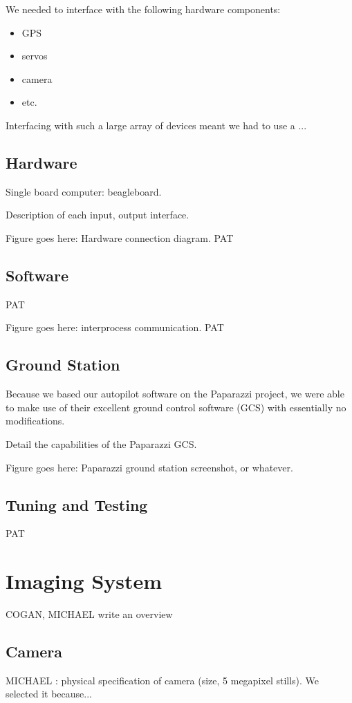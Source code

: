 \documentclass[10pt]{report}
\begin{document}
We needed to interface with the following hardware components:
\begin{itemize}
	\item GPS
	\item servos
	\item camera
	\item etc.
\end{itemize}

Interfacing with such a large array of devices meant we had to use a ...

\subsection{Hardware}
Single board computer: beagleboard.

Description of each input, output interface.

Figure goes here: Hardware connection diagram. PAT
\subsection{Software}
PAT

Figure goes here: interprocess communication. PAT
\subsection{Ground Station}
Because we based our autopilot software on the Paparazzi project, we were able to make use of their excellent ground control software (GCS) with essentially no modifications.

Detail the capabilities of the Paparazzi GCS.

Figure goes here: Paparazzi ground station screenshot, or whatever. 
\subsection{Tuning and Testing}
PAT

\section{Imaging System}
COGAN, MICHAEL write an overview

\subsection{Camera}

MICHAEL : physical specification of camera (size, 5 megapixel stills). We selected it because...
\end{document}

